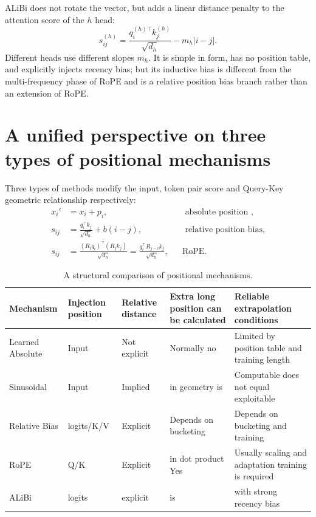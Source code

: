 \documentclass[UTF8,fontset=none,a4paper,10pt]{ctexart}
\begin{document}
ALiBi does not rotate the vector, but adds a linear distance penalty \cite{press2022} to the attention score of the $h$ head:
\begin{equation}
  s_{ij}^{(h)}=
  \frac{q_i^{(h)\top}k_j^{(h)}}{\sqrt{d_h}}
  -m_h|i-j|.
  \label{eq:alibi}
\end{equation}
Different heads use different slopes $m_h$. It is simple in form, has no position table, and explicitly injects recency bias; but its inductive bias is different from the multi-frequency phase of RoPE and is a relative position bias branch rather than an extension of RoPE.

\section{A unified perspective on three types of positional mechanisms}

Three types of methods modify the input, token pair score and Query-Key geometric relationship respectively:
\begin{align}
x_i'&=x_i+p_i, &&\text{ absolute position }, \label{eq:unified-absolute}\\
s_{ij}&=\frac{q_i^\top k_j}{\sqrt{d_h}}+b(i-j), &&\text{ relative position bias}, \label{eq:unified-relative}\\
  s_{ij}&=\frac{(R_iq_i)^\top(R_jk_j)}{\sqrt{d_h}}
  =\frac{q_i^\top R_{j-i}k_j}{\sqrt{d_h}}, &&\text{RoPE}. \label{eq:unified-rope}
\end{align}

\begin{table}[htbp]
\centering
\footnotesize
\begin{tabularx}{\linewidth}{@{}p{2.2cm}p{1.5cm}p{1.8cm}p{1.8cm}X@{}}
\toprule
Mechanism & Injection position & Relative distance & Extra long position can be calculated & Reliable extrapolation conditions \\
\midrule
Learned Absolute & Input & Not explicit & Normally no & Limited by position table and training length \\
Sinusoidal & Input & Implied & in geometry is & Computable does not equal exploitable \\
Relative Bias & logits/K/V & Explicit & Depends on bucketing & Depends on bucketing and training \\
RoPE & Q/K & Explicit & in dot product Yes & Usually scaling and adaptation training is required \\
ALiBi & logits & explicit & is & with strong recency bias \\
\bottomrule
\end{tabularx}
\caption{A structural comparison of positional mechanisms.}
\label{tab:position-compare}
\end{table}
\end{document}
